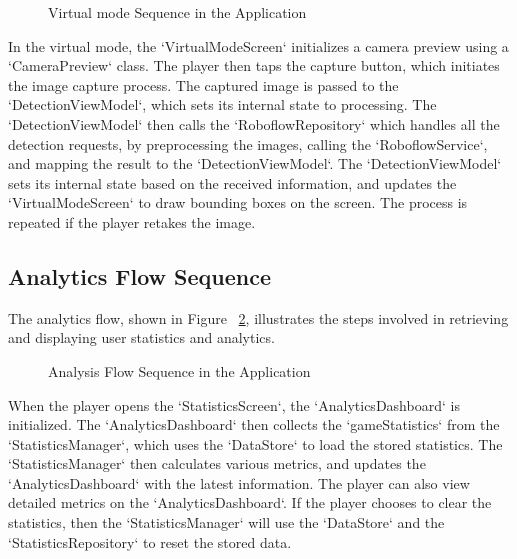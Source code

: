 \begin{figure}[ht!]
    \centering
    
    \caption{Virtual mode Sequence in the Application}
    \label{fig:virtual_mode_flow}
\end{figure}

In the virtual mode, the `VirtualModeScreen` initializes a camera preview using a `CameraPreview` class. The player then taps the capture button, which initiates the image capture process. The captured image is passed to the `DetectionViewModel`, which sets its internal state to processing. The `DetectionViewModel` then calls the `RoboflowRepository` which handles all the detection requests, by preprocessing the images, calling the `RoboflowService`, and mapping the result to the `DetectionViewModel`. The `DetectionViewModel` sets its internal state based on the received information, and updates the `VirtualModeScreen` to draw bounding boxes on the screen. The process is repeated if the player retakes the image.

\subsection{Analytics Flow Sequence}

The analytics flow, shown in Figure ~\ref{fig:analysis_flow}, illustrates the steps involved in retrieving and displaying user statistics and analytics.

\begin{figure}[ht!]
    \centering
    
    \caption{Analysis Flow Sequence in the Application}
    \label{fig:analysis_flow}
\end{figure}

When the player opens the `StatisticsScreen`, the `AnalyticsDashboard` is initialized. The `AnalyticsDashboard` then collects the `gameStatistics` from the `StatisticsManager`, which uses the `DataStore` to load the stored statistics. The `StatisticsManager` then calculates various metrics, and updates the `AnalyticsDashboard` with the latest information. The player can also view detailed metrics on the `AnalyticsDashboard`. If the player chooses to clear the statistics, then the `StatisticsManager` will use the `DataStore` and the `StatisticsRepository` to reset the stored data.

